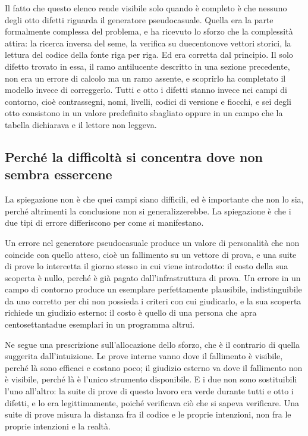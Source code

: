 Il fatto che questo elenco rende visibile solo quando è completo è che nessuno degli otto difetti riguarda il generatore pseudocasuale. Quella era la parte formalmente complessa del problema, e ha ricevuto lo sforzo che la complessità attira: la ricerca inversa del seme, la verifica su duecentonove vettori storici, la lettura del codice della fonte riga per riga. Ed era corretta dal principio. Il solo difetto trovato in essa, il ramo antilucente descritto in una sezione precedente, non era un errore di calcolo ma un ramo assente, e scoprirlo ha completato il modello invece di correggerlo. Tutti e otto i difetti stanno invece nei campi di contorno, cioè contrassegni, nomi, livelli, codici di versione e fiocchi, e sei degli otto consistono in un valore predefinito sbagliato oppure in un campo che la tabella dichiarava e il lettore non leggeva.

\subsection*{Perché la difficoltà si concentra dove non sembra essercene}

La spiegazione non è che quei campi siano difficili, ed è importante che non lo sia, perché altrimenti la conclusione non si generalizzerebbe. La spiegazione è che i due tipi di errore differiscono per come si manifestano.

Un errore nel generatore pseudocasuale produce un valore di personalità che non coincide con quello atteso, cioè un fallimento su un vettore di prova, e una suite di prove lo intercetta il giorno stesso in cui viene introdotto: il costo della sua scoperta è nullo, perché è già pagato dall'infrastruttura di prova. Un errore in un campo di contorno produce un esemplare perfettamente plausibile, indistinguibile da uno corretto per chi non possieda i criteri con cui giudicarlo, e la sua scoperta richiede un giudizio esterno: il costo è quello di una persona che apra centosettantadue esemplari in un programma altrui.

Ne segue una prescrizione sull'allocazione dello sforzo, che è il contrario di quella suggerita dall'intuizione. Le prove interne vanno dove il fallimento è visibile, perché là sono efficaci e costano poco; il giudizio esterno va dove il fallimento non è visibile, perché là è l'unico strumento disponibile. E i due non sono sostituibili l'uno all'altro: la suite di prove di questo lavoro era verde durante tutti e otto i difetti, e lo era legittimamente, poiché verificava ciò che si sapeva verificare. Una suite di prove misura la distanza fra il codice e le proprie intenzioni, non fra le proprie intenzioni e la realtà.

